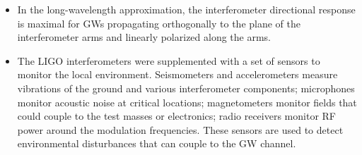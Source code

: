 \documentclass[a4paper,10pt]{article}
\begin{document}
\begin{itemize}
    \item In the long-wavelength approximation, the interferometer directional response is maximal for GWs propagating orthogonally to the plane of the interferometer arms and linearly polarized along the arms.
    \item The LIGO interferometers were supplemented with a set of sensors to monitor the local environment. Seismometers and accelerometers measure vibrations of the ground and various interferometer components; microphones monitor acoustic noise at critical locations; magnetometers monitor fields that could couple to the test masses or electronics; radio receivers monitor RF power around the modulation frequencies. These sensors are used to detect environmental disturbances that can couple to the GW channel.
    \end{itemize}
\end{document}
